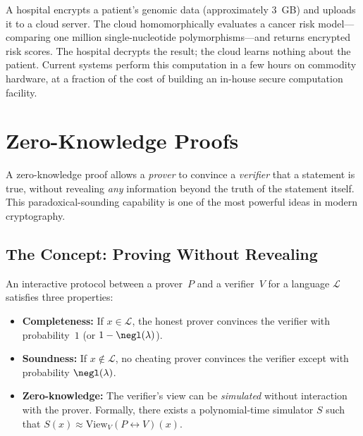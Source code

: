 \begin{example}
\label{ex:fhe-medical}
A hospital encrypts a patient's genomic data (approximately 3~GB) and uploads it to a cloud server.  The cloud homomorphically evaluates a cancer risk model---comparing one million single-nucleotide polymorphisms---and returns encrypted risk scores.  The hospital decrypts the result; the cloud learns nothing about the patient.  Current systems perform this computation in a few hours on commodity hardware, at a fraction of the cost of building an in-house secure computation facility.
\end{example}


\section{Zero-Knowledge Proofs}
\label{sec:zkp}

A zero-knowledge proof allows a \emph{prover} to convince a \emph{verifier} that a statement is true, without revealing \emph{any} information beyond the truth of the statement itself.  This paradoxical-sounding capability is one of the most powerful ideas in modern cryptography.

\subsection{The Concept: Proving Without Revealing}
\label{subsec:zkp-concept}

\begin{definition}
\label{def:zkp}
An interactive protocol between a prover~$P$ and a verifier~$V$ for a language $\mathcal{L}$ satisfies three properties:
\begin{itemize}
\item \textbf{Completeness:} If $x \in \mathcal{L}$, the honest prover convinces the verifier with probability~$1$ (or $1 - \negl(\lambda)$).
\item \textbf{Soundness:} If $x \notin \mathcal{L}$, no cheating prover convinces the verifier except with probability $\negl(\lambda)$.
\item \textbf{Zero-knowledge:} The verifier's view can be \emph{simulated} without interaction with the prover.  Formally, there exists a polynomial-time simulator $S$ such that $S(x) \approx \mathrm{View}_V(P \leftrightarrow V)(x)$.
\end{itemize}
\end{definition}

